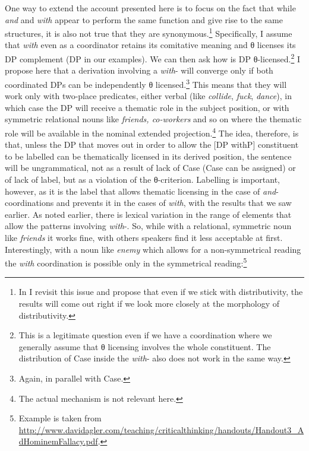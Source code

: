 \documentclass[output=paper]{langsci/langscibook}
\begin{document}
One way to extend the account presented here is to focus on the fact that while
\emph{and} and \emph{with} appear to perform the same function and give rise to
the same structures, it is also not true that they are synonymous.\footnote{In
 I revisit this issue and propose that even if we stick
with distributivity, the results will come out right if we look more closely at
the morphology of distributivity.} Specifically, I assume that \emph{with} even
as a coordinator retains its comitative meaning and θ licenses its DP
complement (DP in our examples). We can then ask how is DP
θ-licensed.\footnote{This is a legitimate question even if we have a
coordination where we generally assume that θ licensing involves the
whole constituent. The distribution of Case inside the \emph{with}-
also does not work in the same way.} I propose here that a derivation involving
a \emph{with}- will converge only if both coordinated DPs can be
independently θ licensed.\footnote{Again, in parallel with Case.}  This
means that they will work only with two-place predicates, either verbal (like
\emph{collide}, \emph{fuck}, \emph{dance}), in which case the DP will receive a
thematic role in the subject position, or with symmetric relational nouns like
\emph{friends, co-workers} and so on where the thematic role will be available
in the nominal extended projection.\footnote{The actual mechanism is not
relevant here.} The idea, therefore, is that, unless the DP that moves out in
order to allow the [DP withP] constituent to be labelled can be thematically
licensed in its derived position, the sentence will be ungrammatical, not as a
result of lack of Case (Case can be assigned) or of lack of label, but as a
violation of the θ-criterion. Labelling is important, however, as it is
the label that allows thematic licensing in the case of
\emph{and}-coordinations and prevents it in the cases of \emph{with}, with the
results that we saw earlier. As noted earlier, there is lexical variation in
the range of elements that allow the patterns involving
\emph{with}-. So, while with a relational, symmetric noun
like \emph{friends} it works fine, with others speakers find it less acceptable
at first. Interestingly, with a noun like \emph{enemy} which allows for a
non-symmetrical reading the \emph{with} coordination is possible only in the
symmetrical reading:\footnote{Example  is taken from \url{http://www.davidagler.com/teaching/criticalthinking/handouts/Handout3_AdHominemFallacy.pdf}.}
\end{document}
